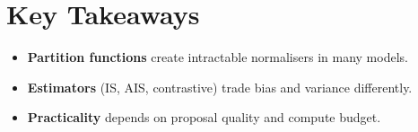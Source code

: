 
\section*{Key Takeaways}

\begin{keytakeaways}
\begin{itemize}[leftmargin=2em]
    \item \textbf{Partition functions} create intractable normalisers in many models.
    \item \textbf{Estimators} (IS, AIS, contrastive) trade bias and variance differently.
    \item \textbf{Practicality} depends on proposal quality and compute budget.
\end{itemize}
\end{keytakeaways}


